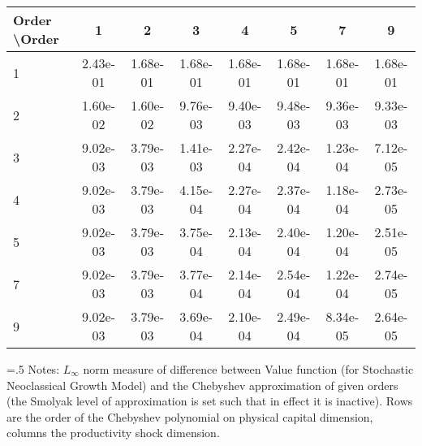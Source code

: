 \begin{tabular*}{1.00\textwidth}{@{\extracolsep{\fill}}l|ccccccc} 
 \hline \hline 
 Order \textbackslash Order & 1 & 2 & 3 & 4 & 5 & 7 & 9 \\ 
 \hline 
1 & 2.43e-01 & 1.68e-01 & 1.68e-01 & 1.68e-01 & 1.68e-01 & 1.68e-01 & 1.68e-01 \\ 
 2 & 1.60e-02 & 1.60e-02 & 9.76e-03 & 9.40e-03 & 9.48e-03 & 9.36e-03 & 9.33e-03 \\ 
 3 & 9.02e-03 & 3.79e-03 & 1.41e-03 & 2.27e-04 & 2.42e-04 & 1.23e-04 & 7.12e-05 \\ 
 4 & 9.02e-03 & 3.79e-03 & 4.15e-04 & 2.27e-04 & 2.37e-04 & 1.18e-04 & 2.73e-05 \\ 
 5 & 9.02e-03 & 3.79e-03 & 3.75e-04 & 2.13e-04 & 2.40e-04 & 1.20e-04 & 2.51e-05 \\ 
 7 & 9.02e-03 & 3.79e-03 & 3.77e-04 & 2.14e-04 & 2.54e-04 & 1.22e-04 & 2.74e-05 \\ 
 9 & 9.02e-03 & 3.79e-03 & 3.69e-04 & 2.10e-04 & 2.49e-04 & 8.34e-05 & 2.64e-05 \\ 
 \hline 
 \end{tabular*} 
\begin{minipage}[t]{1.00\textwidth}{\baselineskip=.5\baselineskip \vspace{.3cm} \footnotesize{ 
Notes: $L_{\infty}$ norm measure of difference between Value function (for Stochastic Neoclassical Growth Model) and the Chebyshev approximation of given orders (the Smolyak level of approximation is set such that in effect it is inactive). Rows are the order of the Chebyshev polynomial on physical capital dimension, columns the productivity shock dimension. \\ 
}} \end{minipage}